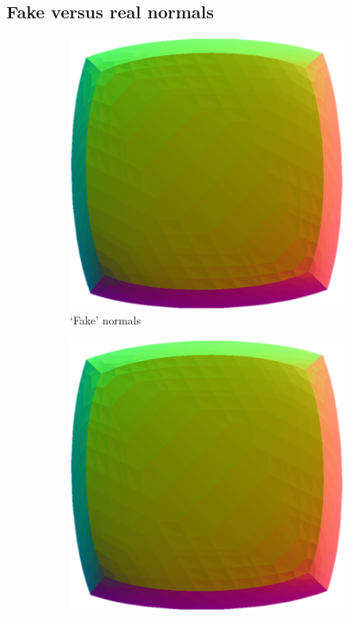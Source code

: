 \subsection{Fake versus real normals}
\label{s:results:normals}

\begin{figure}
	\centering
	\begin{subfigure}[t]{0.32\linewidth}
		\centering
		\includegraphics[width=\textwidth]{content/img/results/normals/cubeFakeNormals.png}
		\caption{`Fake' normals}
		\label{fig:results:normals:original:fake}
	\end{subfigure}
	\begin{subfigure}[t]{0.32\linewidth}
		\centering
		\includegraphics[width=\textwidth]{content/img/results/normals/cubeRealNormals.png}

\end{subfigure}
\end{figure}
